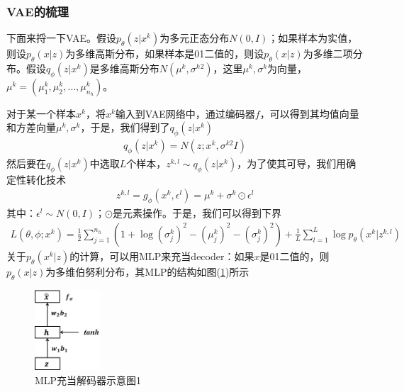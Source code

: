         \subsubsection{VAE的梳理}
            \par
            下面来捋一下VAE。假设$p_\theta(z|x^k)$为多元正态分布$N(0,I)$；如果样本为实值，则设$p_\theta(x|z)$为多维高斯分布，如果样本是01二值的，则设$p_\theta(x|z)$为多维二项分布。假设$q_\phi(z|x^k)$是多维高斯分布$N(\mu^k,\sigma^k{}^2)$，这里$\mu^k,\sigma^k$为向量，$\mu^k = (\mu_1^k,\mu_2^k,\dots,\mu_{n_h}^k)$。
            \par
            对于某一个样本$x^k$，将$x^k$输入到VAE网络中，通过编码器$f$，可以得到其均值向量和方差向量$\mu^k,\sigma^k$，于是，我们得到了$q_\phi(z|x^k)$
            \begin{align*}
            q_\phi(z|x^k) = N(z;x^k,\sigma^{k2}I)
            \end{align*}
            然后要在$q_\phi(z|x^k)$中选取$L$个样本，$z^{k,l} \sim q_\phi(z|x^k)$，为了使其可导，我们用确定性转化技术
            \begin{align*}
            z^{k,l} = g_\phi(x^k,\epsilon^l) = \mu^k+\sigma^k\odot \epsilon^l
            \end{align*}
            其中：$\epsilon^l \sim N(0,I)$；$\odot$是元素操作。于是，我们可以得到下界
            \begin{align*}
            L(\theta,\phi;x^k) = \frac{1}{2}\sum_{j=1}^{n_h} \left( 1+\log(\sigma_j^k)^2 - (\mu_j^k)^2 - (\sigma_j^k)^2 \right) + \frac{1}{L}\sum_{l=1}^L \log p_\theta(x^k|z^{k,l})
            \end{align*}
            关于$p_\theta(x^k|z)$的计算，可以用MLP来充当decoder：如果$x$是01二值的，则$p_\theta(x|z)$为多维伯努利分布，其MLP的结构如图(\ref{fig:MLP充当解码器示意图1})所示
            \begin{figure}[H]
            \centering
            \includegraphics[height=3cm]{images/MLP_acts_as_decoder1.png}
            \caption{MLP充当解码器示意图1}
            \label{fig:MLP充当解码器示意图1}
            \end{figure}
